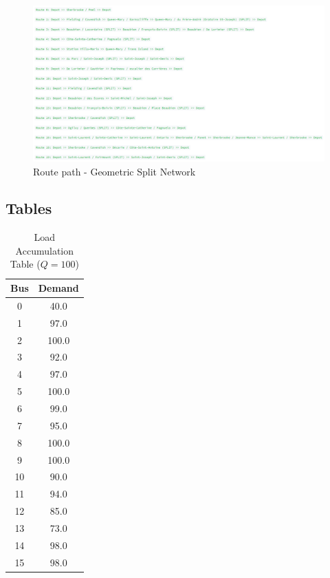 \documentclass[12pt]{article}
\begin{document}
\begin{appendices}
    \begin{figure}[!htb]
        \centering
        \includegraphics[width=1\textwidth]{geometric-route.png}
        \caption{Route path - Geometric Split Network}
        \label{route:geometric-route}
    \end{figure}

    \FloatBarrier
    \subsection{Tables}\label{app:routes}
    \begin{table}[!htbp]
        \centering
        \begin{tabular}{|c|c|}
            \hline
            \textbf{Bus} & \textbf{Demand} \\
            \hline
            0            & 40.0            \\
            1            & 97.0            \\
            2            & 100.0           \\
            3            & 92.0            \\
            4            & 97.0            \\
            5            & 100.0           \\
            6            & 99.0            \\
            7            & 95.0            \\
            8            & 100.0           \\
            9            & 100.0           \\
            10           & 90.0            \\
            11           & 94.0            \\
            12           & 85.0            \\
            13           & 73.0            \\
            14           & 98.0            \\
            15           & 98.0            \\
            \hline
        \end{tabular}
        \caption{Load Accumulation Table ($Q=100$)}
        \label{tab:load-table-geometric}
    \end{table}
\end{appendices}


\newpage
\printbibliography
\newpage
\end{document}
